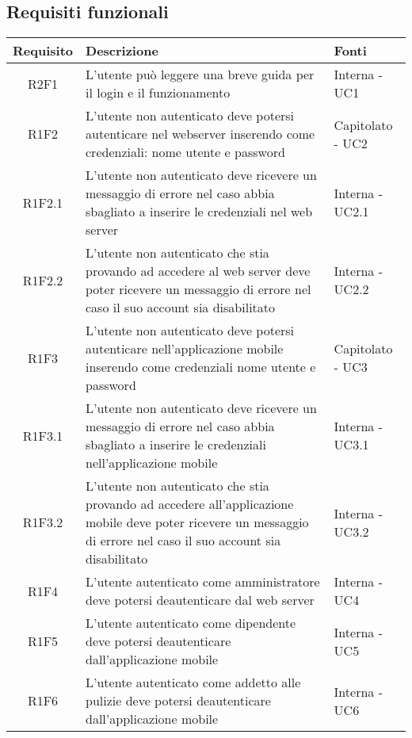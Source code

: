 \subsection{Requisiti funzionali}
\begin{center}
	\begin{longtable}{|c|p{10cm}|p{4cm}|}
		\hline
		\rowcolor{lighter-grayer}
		\textbf{Requisito} & \textbf{Descrizione} & \textbf{Fonti}  \\
		\hline
		\endhead
		
		
		 R2F1 & L'utente può leggere una breve guida per il login e il funzionamento & Interna - UC1 \\
		\hline
		R1F2	&	L'utente non autenticato deve potersi autenticare nel webserver inserendo come credenziali: nome utente e password & Capitolato - UC2	\\
		\hline
		R1F2.1	&	L'utente non autenticato deve ricevere un messaggio di errore nel caso abbia sbagliato a inserire le credenziali nel web server& Interna - UC2.1	\\
		\hline
		R1F2.2	&	L'utente non autenticato che stia provando ad accedere al web server deve poter ricevere un messaggio di errore nel caso il suo account sia disabilitato& Interna - UC2.2	\\
		\hline
		R1F3	&	L'utente non autenticato deve potersi autenticare nell'applicazione mobile inserendo come credenziali nome utente e password & Capitolato - UC3	\\
		\hline
		R1F3.1	&	L'utente non autenticato deve ricevere un messaggio di errore nel caso abbia sbagliato a inserire le credenziali nell'applicazione mobile& Interna - UC3.1	\\
		\hline
		R1F3.2	&	L'utente non autenticato che stia provando ad accedere all'applicazione mobile deve poter ricevere un messaggio di errore nel caso il suo account sia disabilitato& Interna - UC3.2	\\
		\hline
		R1F4	&	L'utente autenticato come amministratore deve potersi deautenticare dal web server& Interna - UC4	\\
		\hline
		R1F5	&	L'utente autenticato come dipendente deve potersi deautenticare dall'applicazione mobile& Interna - UC5	\\
		\hline
		R1F6	&	L'utente autenticato come addetto alle pulizie deve potersi deautenticare dall'applicazione mobile& Interna - UC6	\\

\end{longtable}
\end{center}
